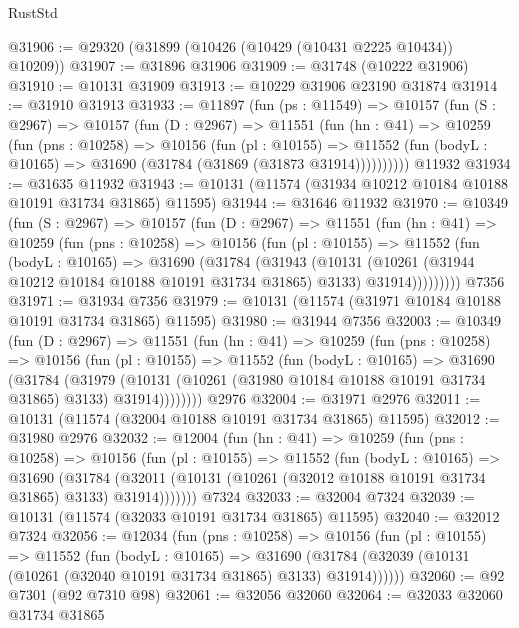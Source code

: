 \begin{lexlean}{RustStd}
\begin{coremodule}
@31906 := @29320 (@31899 (@10426 (@10429 (@10431 @2225 @10434)) @10209))
@31907 := @31896 @31906
@31909 := @31748 (@10222 @31906)
@31910 := @10131 @31909
@31913 := @10229 @31906 @23190 @31874
@31914 := @31910 @31913
@31933 := @11897
    (fun (ps : @11549) =>
    @10157
      (fun (S : @2967) =>
      @10157
        (fun (D : @2967) =>
        @11551
          (fun (hn : @41) =>
          @10259
            (fun (pns : @10258) =>
            @10156
              (fun (pl : @10155) =>
              @11552 (fun (bodyL : @10165) => @31690 (@31784 (@31869 (@31873 @31914))))))))))
    @11932
@31934 := @31635 @11932
@31943 := @10131 (@11574 (@31934 @10212 @10184 @10188 @10191 @31734 @31865) @11595)
@31944 := @31646 @11932
@31970 := @10349
    (fun (S : @2967) =>
    @10157
      (fun (D : @2967) =>
      @11551
        (fun (hn : @41) =>
        @10259
          (fun (pns : @10258) =>
          @10156
            (fun (pl : @10155) =>
            @11552
              (fun (bodyL : @10165) =>
              @31690
                (@31784
                  (@31943
                    (@10131
                      (@10261 (@31944 @10212 @10184 @10188 @10191 @31734 @31865) @3133)
                      @31914)))))))))
    @7356
@31971 := @31934 @7356
@31979 := @10131 (@11574 (@31971 @10184 @10188 @10191 @31734 @31865) @11595)
@31980 := @31944 @7356
@32003 := @10349
    (fun (D : @2967) =>
    @11551
      (fun (hn : @41) =>
      @10259
        (fun (pns : @10258) =>
        @10156
          (fun (pl : @10155) =>
          @11552
            (fun (bodyL : @10165) =>
            @31690
              (@31784
                (@31979
                  (@10131 (@10261 (@31980 @10184 @10188 @10191 @31734 @31865) @3133) @31914))))))))
    @2976
@32004 := @31971 @2976
@32011 := @10131 (@11574 (@32004 @10188 @10191 @31734 @31865) @11595)
@32012 := @31980 @2976
@32032 := @12004
    (fun (hn : @41) =>
    @10259
      (fun (pns : @10258) =>
      @10156
        (fun (pl : @10155) =>
        @11552
          (fun (bodyL : @10165) =>
          @31690
            (@31784
              (@32011 (@10131 (@10261 (@32012 @10188 @10191 @31734 @31865) @3133) @31914)))))))
    @7324
@32033 := @32004 @7324
@32039 := @10131 (@11574 (@32033 @10191 @31734 @31865) @11595)
@32040 := @32012 @7324
@32056 := @12034
    (fun (pns : @10258) =>
    @10156
      (fun (pl : @10155) =>
      @11552
        (fun (bodyL : @10165) =>
        @31690 (@31784 (@32039 (@10131 (@10261 (@32040 @10191 @31734 @31865) @3133) @31914))))))
@32060 := @92 @7301 (@92 @7310 @98)
@32061 := @32056 @32060
@32064 := @32033 @32060 @31734 @31865

\end{coremodule}
\end{lexlean}
